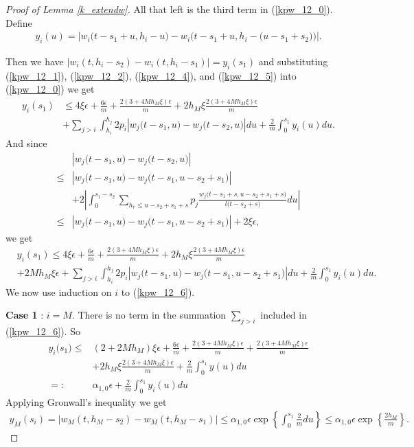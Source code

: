 \documentclass[10pt,a4paper]{amsart}
\begin{document}
\begin{proof}[Proof of Lemma \ref{k_extendw}]
All that left is the third term in (\ref{kpw_12_0}). Define
\begin{align}
y_i(u)=\left|w_i\big(t-s_1+u,h_i-u\big)-w_i\big(t-s_1+u,h_i-\big(u-s_1+s_2\big)\big)\right|\label{kpw_12_5}.
\end{align}

Then we have $\left|w_i(t,h_i-s_2)-w_i(t,h_i-s_1)\right|=y_i(s_1)$ and substituting (\ref{kpw_12_1}), (\ref{kpw_12_2}), (\ref{kpw_12_4}), and (\ref{kpw_12_5}) into (\ref{kpw_12_0}) we get
\begin{align*} 
y_i(s_1)&\leq 4\xi\epsilon+\frac{6\epsilon}{m}+\frac{2(3+4M h_M\xi)\epsilon}{m}
+2h_M\xi \frac{2(3+4M h_M \xi)\epsilon}{m}\\
&+\sum_{j>i}\int_{ h_i}^{h_j}2p_i
\left|
w_j\big(t-s_1,u\big)-w_j\big(t-s_2,u\big)
\right|
du+\frac{2}{m}\int_{0}^{s_1}y_i(u)du.
\end{align*} 
And since
{
\begin{align*} 
&\left|
w_j\big(t-s_1,u\big)-w_j\big(t-s_2,u\big)
\right|\\
\leq& 
\left|
w_j\big(t-s_1,u\big)-w_j\big(t-s_1,u-s_2+s_1\big)
\right|\nonumber\\
&+2\left|
\int_{0}^{s_1-s_2}\sum_{h_r\leq u-s_2+s_1+s}p_j\frac{w_j\big(t-s_1+s,u-s_2+s_1+s\big)}{l\big(t-s_2+s\big)}du
\right|\nonumber\\
\leq&\left|
w_j\big(t-s_1,u\big)-w_j\big(t-s_1,u-s_2+s_1\big)
\right|+2\xi\epsilon,
\end{align*}}
we get
\begin{align} 
&y_i(s_1)\leq 4\xi\epsilon+\frac{6\epsilon}{m}+\frac{2(3+4M h_M \xi)\epsilon}{m}
+2h_M\xi \frac{2(3+4M h_M \xi)\epsilon}{m}\nonumber\\
&+2Mh_M\xi\epsilon+\sum_{j>i}\int_{ h_i}^{h_j}2p_i
\left|
w_j\big(t-s_1,u\big)-w_j\big(t-s_1,u-s_2+s_1\big)
\right|
du+\frac{2}{m}\int_{0}^{s_1}y_i(u)du\label{kpw_12_6}.
\end{align} 
We now use induction on $i$ to (\ref{kpw_12_6}).

\textbf{Case 1} : $i=M$. There is no term in the summation $\sum_{j>i}$ included in (\ref{kpw_12_6}). So 
\begin{align*} 
y_i\big(s_1\big)\leq& (2+2Mh_M)\xi\epsilon+\frac{6\epsilon}{m}+\frac{2(3+4 M h_M \xi)\epsilon}{m}
+\frac{2(3+4M h_M \xi)\epsilon}{m}\\
&+2h_M\xi \frac{2(3+4 M h_M \xi)\epsilon}{m}
+\frac{2}{m}\int_{0}^{s_1}y(u)du\\
=:&\alpha_{1,0}\epsilon+\frac{2}{m}\int_{0}^{s_1}y_i(u)du
\end{align*} 
Applying Gronwall's inequality we get
\begin{align*} 
y_M(s_i)=\left|w_M(t,h_M-s_2)-w_M(t,h_M-s_1)\right|\leq\alpha_{1,0}\epsilon \exp\left\{\int_{0}^{s_1}\frac{2}{m}du\right\}\leq\alpha_{1,0}\epsilon \exp\left\{\frac{2h_M}{m}\right\}.
\end{align*} 


\end{proof}
\end{document}
